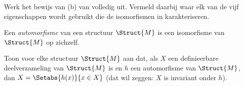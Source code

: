 \documentclass[../../../include/open-logic-section]{subfiles}
\begin{document}
\begin{prob}
Werk het bewijs van (b) van  volledig
uit. Vermeld daarbij waar elk van de vijf eigenschappen wordt gebruikt
die de isomorfismen in 
karakteriseren.
\end{prob}

\begin{defn}
Een \emph{automorfisme} van een structuur $\Struct{M}$ is een isomorfisme
van $\Struct{M}$ op zichzelf.
\end{defn}

\begin{prob}
Toon voor elke structuur $\Struct{M}$ aan dat, als $X$ een definieerbare
deelverzameling van $\Struct{M}$ is en $h$ een automorfisme van
$\Struct{M}$, dan $X = \Setabs{h(x)}{x \in X}$ (dat wil zeggen: $X$ is
invariant onder $h$).
\end{prob}
\end{document}
